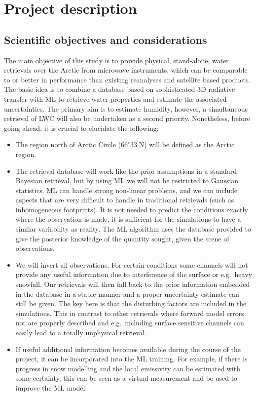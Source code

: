 \documentclass[12pt,oneside,a4paper]{article}
\begin{document}
\section{Project description}
%
\subsection{Scientific objectives and considerations}
The main objective of this study is to provide physical, stand-alone, water retrievals over the Arctic from microwave instruments, which can be comparable to or better in performance than existing reanalyses and satellite based products. The basic idea is to combine a database based on sophisticated 3D radiative transfer with ML to retrieve water properties and estimate the associated uncertainties. The primary aim is to estimate humidity, however, a simultaneous retrieval of LWC will also be undertaken as a second priority. Nonetheless, before going ahead, it is crucial to elucidate the following:
\begin{itemize}
 \vspace{-1ex}
\item The region north of Arctic Circle ($66^{\circ}33^{'}$N) will be defined
  as the Arctic region.
 \vspace{-1ex}
\item The retrieval database will work like the prior assumptions in a standard
  Bayesian retrieval, but by using ML we will not be restricted to Gaussian
  statistics. ML can handle strong non-linear problems, and we can include
  aspects that are very difficult to handle in traditional retrievals (such as
  inhomogeneous footprints). It is not needed to predict the conditions exactly
  where the observation is made, it is sufficient for the simulations to have a
  similar variability as reality. The ML algorithm uses the database provided
  to give the posterior knowledge of the quantity sought, given the scene of
  observations.
 \vspace{-1ex}
\item We will invert all observations. For certain conditions some channels
  will not provide any useful information due to interference of the surface or
  e.g.\ heavy snowfall. Our retrievals will then fall back to the prior
  information embedded in the database in a stable manner and a proper
  uncertainty estimate can still be given. The key here is that the disturbing
  factors are included in the simulations. This in contrast to other retrievals
  where forward model errors not are properly described and e.g.\ including
  surface sensitive channels can easily lead to a totally unphysical retrieval.
  \vspace{-1ex}
\item If useful additional information becomes available during the course of
  the project, it can be incorporated into the ML training. For example, if
  there is progress in snow modelling and the local emissivity can be estimated
  with some certainty, this can be seen as a virtual measurement and be used to
  improve the ML model.
\end{itemize}
\end{document}

